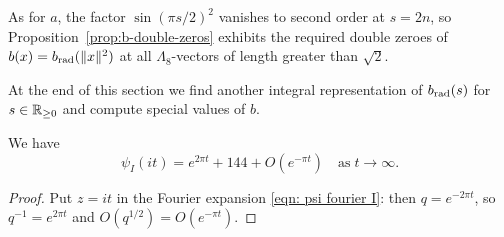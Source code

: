 As for $a$, the factor $\sin(\pi s/2)^2$ vanishes to second order at $s = 2n$, so Proposition~\ref{prop:b-double-zeros} exhibits the required double zeroes of $b(x) = b_{\mathrm{rad}}(\|x\|^2)$ at all $\Lambda_8$-vectors of length greater than $\sqrt 2$.

At the end of this section we find another integral representation of $b_{\mathrm{rad}}(s)$ for $s\in\mathbb{R}_{\geq0}$ and compute special values of $b$.

\begin{lemma}\label{lemma:psiI-asymptotic}\leanok
We have
\begin{equation}\label{eqn: psi asymptotic}
\psi_I(it)=e^{2\pi t}+144+O(e^{-\pi t})\quad\mbox{as}\;t\to\infty.
\end{equation}
\end{lemma}
\begin{proof}
Put $z = it$ in the Fourier expansion \eqref{eqn: psi fourier I}: then $q = e^{-2\pi t}$, so $q^{-1} = e^{2\pi t}$ and $O(q^{1/2}) = O(e^{-\pi t})$.
\end{proof}

